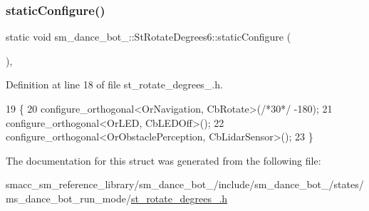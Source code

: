 \subsubsection{\texorpdfstring{static\+Configure()}{staticConfigure()}}
{\footnotesize\ttfamily static void sm\+\_\+dance\+\_\+bot\+\_\+::\+St\+Rotate\+Degrees6\+::static\+Configure (\begin{DoxyParamCaption}{ }\end{DoxyParamCaption})\hspace{0.3cm}{\ttfamily [inline]}, {\ttfamily [static]}}



Definition at line 18 of file st\+\_\+rotate\+\_\+degrees\+\_.\+h.


\begin{DoxyCode}
19   \{
20     configure\_orthogonal<OrNavigation, CbRotate>(\textcolor{comment}{/*30*/} -180);
21     configure\_orthogonal<OrLED, CbLEDOff>();
22     configure\_orthogonal<OrObstaclePerception, CbLidarSensor>();
23   \}
\end{DoxyCode}


The documentation for this struct was generated from the following file\+:\begin{DoxyCompactItemize}
\item 
smacc\+\_\+sm\+\_\+reference\+\_\+library/sm\+\_\+dance\+\_\+bot\+\_/include/sm\+\_\+dance\+\_\+bot\+\_/states/ms\+\_\+dance\+\_\+bot\+\_\+run\+\_\+mode/\hyperlink{2_2include_2sm__dance__bot__2_2states_2ms__dance__bot__run__mode_2st__rotate__degrees__6_8h}{st\+\_\+rotate\+\_\+degrees\+\_.\+h}\end{DoxyCompactItemize}
